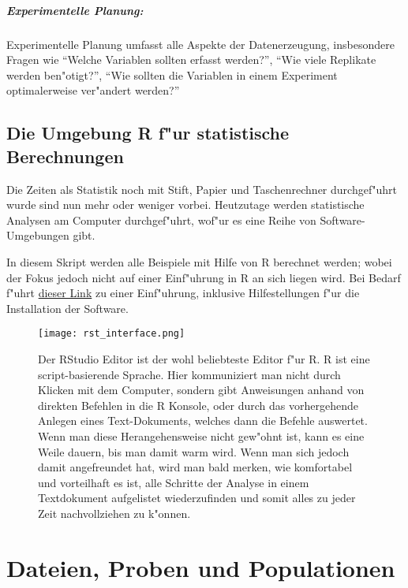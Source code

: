 \documentclass[a4paper,twoside]{tufte-book}\usepackage[]{graphicx}\usepackage[]{color}
\begin{document}
\paragraph{Experimentelle Planung:} Experimentelle Planung umfasst alle Aspekte der Datenerzeugung, insbesondere Fragen wie "`Welche Variablen sollten erfasst werden?"', "`Wie viele Replikate werden ben"otigt?"', "`Wie sollten die Variablen in einem Experiment optimalerweise ver"andert werden?"'


\section{Die Umgebung R f"ur statistische Berechnungen}

Die Zeiten als Statistik noch mit Stift, Papier und Taschenrechner durchgef"uhrt wurde sind nun mehr oder weniger vorbei. Heutzutage werden statistische Analysen am Computer durchgef"uhrt, wof"ur es eine Reihe von Software-Umgebungen gibt.

In diesem Skript werden alle Beispiele mit Hilfe von R berechnet werden; wobei der Fokus jedoch nicht auf einer Einf"uhrung in R an sich liegen wird. Bei Bedarf f"uhrt  \href{http://biometry.github.io/APES/R/R10-gettingStarted.html}{dieser Link} zu einer Einf"uhrung, inklusive Hilfestellungen f"ur die Installation der Software.

\begin{figure}[]
\begin{center}
\texttt{[image: rst\_interface.png]}
\caption{Der RStudio Editor ist der wohl beliebteste Editor f"ur R. R ist eine script-basierende Sprache. Hier kommuniziert man nicht durch Klicken mit dem Computer, sondern gibt Anweisungen anhand von direkten Befehlen in die R Konsole, oder durch das vorhergehende Anlegen eines Text-Dokuments, welches dann die Befehle auswertet. Wenn man diese Herangehensweise nicht gew"ohnt ist, kann es eine Weile dauern, bis man damit warm wird. Wenn man sich jedoch damit angefreundet hat, wird man bald merken, wie komfortabel und vorteilhaft es ist, alle Schritte der Analyse in einem Textdokument aufgelistet wiederzufinden und somit alles zu jeder Zeit nachvollziehen zu k"onnen.}
\label{fig: Rstudio}
\end{center}
\end{figure}



\chapter{Dateien, Proben und Populationen}
\end{document}

